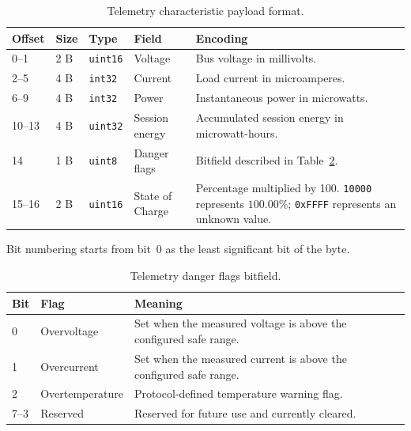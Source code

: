 \begin{table}[H]
	\centering
	\small
	\caption{Telemetry characteristic payload format.}
	\label{tab:wattmate_telemetry_payload}
	\begin{tabular}{p{} p{} p{} p{} p{}}
		\toprule
		\textbf{Offset} & \textbf{Size} & \textbf{Type} & \textbf{Field} & \textbf{Encoding} \\
		\midrule
		0--1 &
		2 B &
		\texttt{uint16} &
		Voltage &
		Bus voltage in millivolts. \\
		
		2--5 &
		4 B &
		\texttt{int32} &
		Current &
		Load current in microamperes. \\
		
		6--9 &
		4 B &
		\texttt{int32} &
		Power &
		Instantaneous power in microwatts. \\
		
		10--13 &
		4 B &
		\texttt{uint32} &
		Session energy &
		Accumulated session energy in microwatt-hours. \\
		
		14 &
		1 B &
		\texttt{uint8} &
		Danger flags &
		Bitfield described in Table~\ref{tab:wattmate_danger_flags}. \\
		
		15--16 &
		2 B &
		\texttt{uint16} &
		State of Charge &
		Percentage multiplied by 100. \texttt{10000} represents \(100.00\%\); \texttt{0xFFFF} represents an unknown value. \\
		\bottomrule
	\end{tabular}
\end{table}

Bit numbering starts from bit~0 as the least significant bit of the byte.

\begin{table}[H]
	\centering
	\small
	\caption{Telemetry danger flags bitfield.}
	\label{tab:wattmate_danger_flags}
	\begin{tabular}{p{} p{} p{}}
		\toprule
		\textbf{Bit} & \textbf{Flag} & \textbf{Meaning} \\
		\midrule
		0 &
		Overvoltage &
		Set when the measured voltage is above the configured safe range. \\
		
		1 &
		Overcurrent &
		Set when the measured current is above the configured safe range. \\
		
		2 &
		Overtemperature &
		Protocol-defined temperature warning flag. \\
		
		7--3 &
		Reserved &
		Reserved for future use and currently cleared. \\
		\bottomrule
	\end{tabular}
\end{table}

